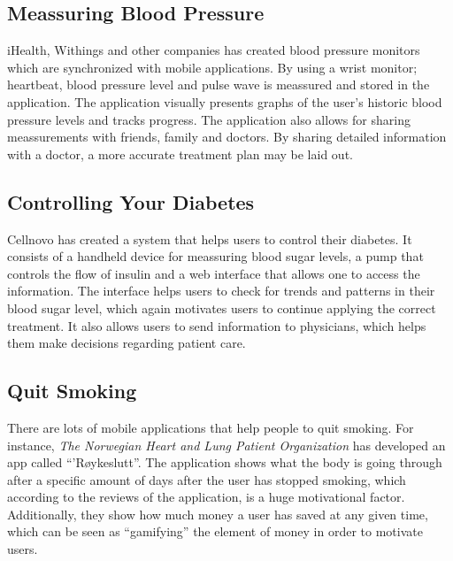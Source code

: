 \subsection{Meassuring Blood Pressure}
\label{sec:bloodpressure}
iHealth, Withings and other companies has created blood pressure monitors which are synchronized with mobile applications. By using a wrist monitor; heartbeat, blood pressure level and pulse wave is meassured and stored in the application. The application visually presents graphs of the user's historic blood pressure levels and tracks progress. The application also allows for sharing meassurements with friends, family and doctors. By sharing detailed information with a doctor, a more accurate treatment plan may be laid out.


\subsection{Controlling Your Diabetes}
\label{sec:controldiabetes}
Cellnovo has created a system that helps users to control their diabetes. It consists of a handheld device for meassuring blood sugar levels, a pump that controls the flow of insulin and a web interface that allows one to access the information. The interface helps users to check for trends and patterns in their blood sugar level, which again motivates users to continue applying the correct treatment. It also allows users to send information to physicians, which helps them make decisions regarding patient care.
      

\subsection{Quit Smoking}
\label{sec:quitsmoking}
There are lots of mobile applications that help people to quit smoking. For instance, \emph{The Norwegian Heart and Lung Patient Organization} has developed an app called ``'R\o ykeslutt''. The application shows what the body is going through after a specific amount of days after the user has stopped smoking, which according to the reviews of the application, is a huge motivational factor. Additionally, they show how much money a user has saved at any given time, which can be seen as ``gamifying'' the element of money in order to motivate users.  


